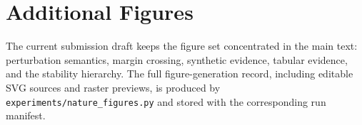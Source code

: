 \section{Additional Figures}
\label{app:additional-figures}

The current submission draft keeps the figure set concentrated in the main
text: perturbation semantics, margin crossing, synthetic evidence, tabular
evidence, and the stability hierarchy.  The full figure-generation record,
including editable SVG sources and raster previews, is produced by
\texttt{experiments/nature\_figures.py} and stored with the corresponding
run manifest.

